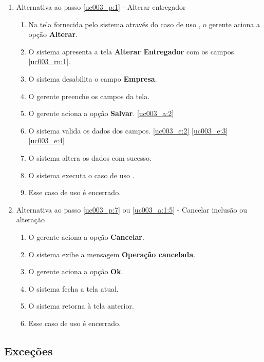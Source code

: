 \begin{enumerate}[label=A\arabic*]
	\item Alternativa ao passo \ref{uc003_p:1} - Alterar entregador \label{uc003_a:1}
	\begin{enumerate}[label*=.\arabic*]
		\item Na tela fornecida pelo sistema através do caso de uso , o gerente aciona a opção \textbf{Alterar}. 
		\item O sistema apresenta a tela \textbf{Alterar Entregador} com os campos \ref{uc003_rn:1}. \label{uc003_a:1:2}
		\item O sistema desabilita o campo \textbf{Empresa}.
		\item O gerente preenche os campos da tela. \label{uc003_a:1:4}
		\item O gerente aciona a opção \textbf{Salvar}. \label{uc003_a:1:5}\ref{uc003_a:2}
		\item O sistema valida os dados dos campos. \ref{uc003_e:2} \ref{uc003_e:3} \ref{uc003_e:4}
		\item O sistema altera os dados com sucesso.
		\item O sistema executa o caso de uso .
		\item Esse caso de uso é encerrado.
	\end{enumerate}
	
	\item Alternativa ao passo \ref{uc003_p:7} ou \ref{uc003_a:1:5} - Cancelar inclusão ou alteração \label{uc003_a:2}
	\begin{enumerate}[label*=.\arabic*]
		\item O gerente aciona a opção \textbf{Cancelar}.
		\item O sistema exibe a mensagem \textbf{Operação cancelada}.
		\item O gerente aciona a opção \textbf{Ok}.
		\item O sistema fecha a tela atual.
		\item O sistema retorna à tela anterior.
		\item Esse caso de uso é encerrado.
	\end{enumerate} 	
\end{enumerate}

\subsection{Exceções}

